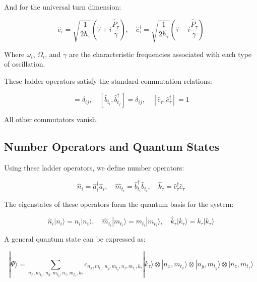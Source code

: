 \documentclass{article}
\begin{document}
And for the universal turn dimension:

\begin{equation}
\hat{c}_\tau = \sqrt{\frac{1}{2\hbar_\tau}}(\hat{\tau} + i\frac{\hat{P}_\tau}{\gamma}), \quad \hat{c}_\tau^\dagger = \sqrt{\frac{1}{2\hbar_\tau}}(\hat{\tau} - i\frac{\hat{P}_\tau}{\gamma})
\end{equation}

Where $\omega_i$, $\Omega_i$, and $\gamma$ are the characteristic frequencies associated with each type of oscillation.

These ladder operators satisfy the standard commutation relations:

\begin{equation}
[\hat{a}_i, \hat{a}_j^\dagger] = \delta_{ij}, \quad [\hat{b}_{t_i}, \hat{b}_{t_j}^\dagger] = \delta_{ij}, \quad [\hat{c}_\tau, \hat{c}_\tau^\dagger] = 1
\end{equation}

All other commutators vanish.

\subsection{Number Operators and Quantum States}

Using these ladder operators, we define number operators:

\begin{equation}
\hat{n}_i = \hat{a}_i^\dagger \hat{a}_i, \quad \hat{m}_{t_i} = \hat{b}_{t_i}^\dagger \hat{b}_{t_i}, \quad \hat{k}_\tau = \hat{c}_\tau^\dagger \hat{c}_\tau
\end{equation}

The eigenstates of these operators form the quantum basis for the system:

\begin{equation}
\hat{n}_i |n_i\rangle = n_i |n_i\rangle, \quad \hat{m}_{t_i} |m_{t_i}\rangle = m_{t_i} |m_{t_i}\rangle, \quad \hat{k}_\tau |k_\tau\rangle = k_\tau |k_\tau\rangle
\end{equation}

A general quantum state can be expressed as:

\begin{equation}
|\Psi\rangle = \sum_{n_x,m_{t_x},n_y,m_{t_y},n_z,m_{t_z},k_\tau} c_{n_x,m_{t_x},n_y,m_{t_y},n_z,m_{t_z},k_\tau} |k_\tau\rangle \otimes |n_x, m_{t_x}\rangle \otimes |n_y, m_{t_y}\rangle \otimes |n_z, m_{t_z}\rangle
\end{equation}
\end{document}
